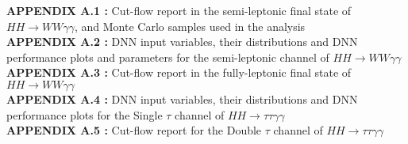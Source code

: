\singlespacing
\textbf{APPENDIX A.1 :} Cut-flow report in the semi-leptonic final state of $HH\rightarrow{WW\gamma\gamma}$, and Monte Carlo samples used in the analysis \\
\textbf{APPENDIX A.2 :} DNN input variables, their distributions and DNN performance plots and parameters for the semi-leptonic channel of $HH\rightarrow{WW\gamma\gamma}$\\
\textbf{APPENDIX A.3 :} Cut-flow report in the fully-leptonic final state of $HH\rightarrow{WW\gamma\gamma}$ \\
\textbf{APPENDIX A.4 :} DNN input variables, their distributions and DNN performance plots for the Single $\tau$ channel of $HH\rightarrow{\tau\tau\gamma\gamma}$ \\
\textbf{APPENDIX A.5 :} Cut-flow report for the Double $\tau$ channel of $HH\rightarrow{\tau\tau\gamma\gamma}$ \\
\newpage